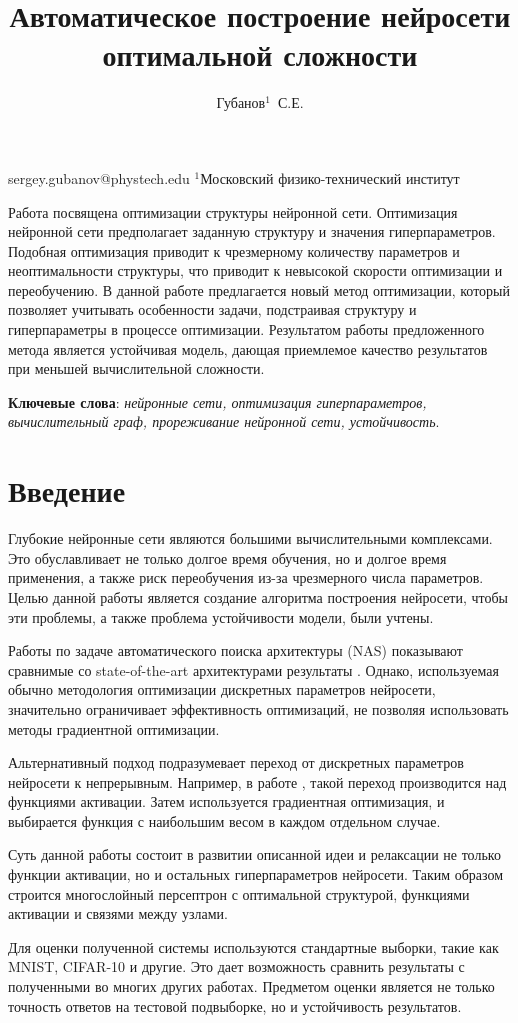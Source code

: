 \documentclass[12pt,twoside]{article}
\begin{document}
\title
    {Автоматическое построение нейросети оптимальной сложности}
\author
    {Губанов$^1$~С.Е.} %
\email
    {sergey.gubanov@phystech.edu}
\organization
    {$^1$Московский физико-технический институт}
\abstract
	{Работа посвящена оптимизации структуры нейронной сети. Оптимизация нейронной сети предполагает заданную структуру и значения гиперпараметров. Подобная оптимизация приводит к чрезмерному количеству параметров и неоптимальности структуры, что приводит к невысокой скорости оптимизации и переобучению. В данной работе предлагается новый метод оптимизации, который позволяет учитывать особенности задачи, подстраивая структуру и гиперпараметры в процессе оптимизации. Результатом работы предложенного метода является устойчивая модель, дающая приемлемое качество результатов при меньшей вычислительной сложности.
		
\bigskip
\textbf{Ключевые слова}: \emph {нейронные сети, оптимизация гиперпараметров, вычислительный граф, прореживание нейронной сети, устойчивость}.

}
\maketitle

\section{Введение}
Глубокие нейронные сети являются большими вычислительными комплексами. Это обуславливает не только долгое время обучения, но и долгое время применения, а также риск переобучения из-за чрезмерного числа параметров. Целью данной работы является создание алгоритма построения нейросети, чтобы эти проблемы, а также проблема устойчивости модели, были учтены. 

Работы по задаче автоматического поиска архитектуры (NAS) показывают сравнимые со state-of-the-art архитектурами результаты \cite{zoph2016neural}. Однако, используемая обычно методология оптимизации дискретных параметров нейросети, значительно ограничивает эффективность оптимизаций, не позволяя использовать методы градиентной оптимизации.

Альтернативный подход подразумевает переход от дискретных параметров нейросети к непрерывным. Например, в работе \cite{liu2018darts}, такой переход производится над функциями активации. Затем используется градиентная оптимизация, и выбирается функция с наибольшим весом в каждом отдельном случае.

Суть данной работы состоит в развитии описанной идеи и релаксации не только функции активации, но и остальных гиперпараметров нейросети. Таким образом строится многослойный персептрон с оптимальной структурой, функциями активации и связями между узлами.

Для оценки полученной системы используются стандартные выборки, такие как MNIST\cite{lecun-mnist}, CIFAR-10 и другие. Это дает возможность сравнить результаты с полученными во многих других работах. Предметом оценки является не только точность ответов на тестовой подвыборке, но и устойчивость результатов.



\end{document}
